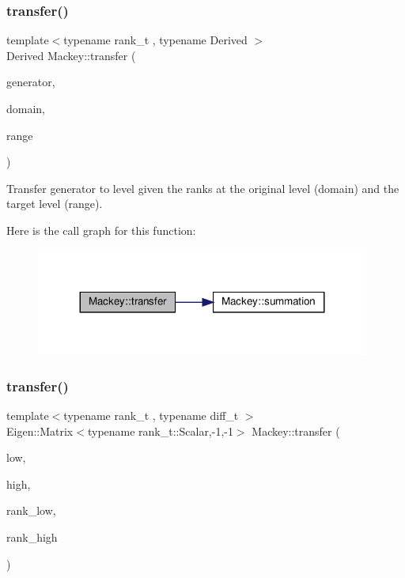 \subsubsection{\texorpdfstring{transfer()}{transfer()}\hspace{0.1cm}{\footnotesize\ttfamily [5/6]}}
{\footnotesize\ttfamily template$<$typename rank\+\_\+t , typename Derived $>$ \\
Derived Mackey\+::transfer (\begin{DoxyParamCaption}\item[{const Eigen\+::\+Matrix\+Base$<$ Derived $>$ \&}]{generator,  }\item[{const rank\+\_\+t \&}]{domain,  }\item[{const rank\+\_\+t \&}]{range }\end{DoxyParamCaption})}



Transfer generator to level given the ranks at the original level (domain) and the target level (range). 

Here is the call graph for this function\+:\nopagebreak
\begin{figure}[H]
\begin{center}
\leavevmode
\includegraphics[width=311pt]{namespaceMackey_a0550bf97e47b3c319cb5e1bd81008d89_cgraph}
\end{center}
\end{figure}
\mbox{\label{namespaceMackey_a3f20cf0ccf7d280f6a6e308c381dc350}} 
\subsubsection{\texorpdfstring{transfer()}{transfer()}\hspace{0.1cm}{\footnotesize\ttfamily [6/6]}}
{\footnotesize\ttfamily template$<$typename rank\+\_\+t , typename diff\+\_\+t $>$ \\
Eigen\+::\+Matrix$<$typename rank\+\_\+t\+::\+Scalar,-\/1,-\/1$>$ Mackey\+::transfer (\begin{DoxyParamCaption}\item[{const \hyperlink{classMackey_1_1Homology}{Homology}$<$ rank\+\_\+t, diff\+\_\+t $>$ \&}]{low,  }\item[{const \hyperlink{classMackey_1_1Homology}{Homology}$<$ rank\+\_\+t, diff\+\_\+t $>$ \&}]{high,  }\item[{const rank\+\_\+t \&}]{rank\+\_\+low,  }\item[{const rank\+\_\+t \&}]{rank\+\_\+high }\end{DoxyParamCaption})}



